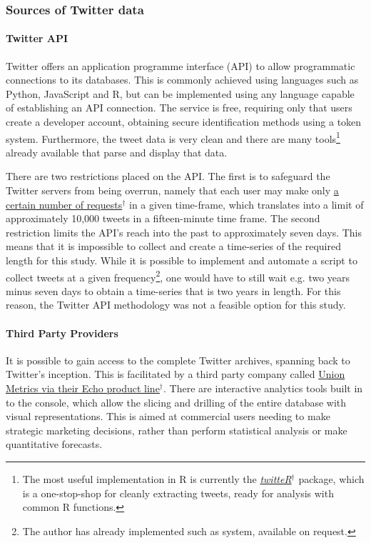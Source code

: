 \documentclass{article}
\begin{document}
\subsubsection{Sources of Twitter data \label{twitter-sources}}
\label{sec-1-2-3}


\paragraph{Twitter API}
\label{sec-1-2-3-1}
Twitter offers an application programme interface (API) to allow programmatic connections to its databases. This is commonly achieved using languages such as Python, JavaScript and R, but can be implemented using any language capable of establishing an API connection.
The service is free, requiring only that users create a developer account, obtaining secure identification methods using a token system. Furthermore, the tweet data is very clean and there are many tools\footnote{The most useful implementation in R is currently the \href{https://cran.r-project.org/web/packages/twitteR/index.html}{\emph{twitteR$^{\dag{}}$}} package, which is a one-stop-shop for cleanly extracting tweets, ready for analysis with common R functions.} already available that parse and display that data.

There are two restrictions placed on the API. The first is to safeguard the Twitter servers from being overrun, namely that each user may make only \href{https://dev.twitter.com/rest/public/rate-limits}{a certain number of requests$^{\dag{}}$} in a given time-frame, which translates into a limit of approximately 10,000 tweets in a fifteen-minute time frame. The second restriction limits the API's reach into the past to approximately seven days. This means that it is impossible to collect and create a time-series of the required length for this study. While it is possible to implement and automate a script to collect tweets at a given frequency\footnote{The author has already implemented such as system, available on request.}, one would have to still wait e.g. two years minus seven days to obtain a time-series that is two years in length. For this reason, the Twitter API methodology was not a feasible option for this study.



\paragraph{Third Party Providers}
\label{sec-1-2-3-2}
It is possible to gain access to the complete Twitter archives, spanning back to Twitter's inception. This is facilitated by a third party company called \href{https://unionmetrics.com/product/echo-twitter-archive-search/}{Union Metrics via their Echo product line$^{\dag{}}$}. There are interactive analytics tools built in to the console, which allow the slicing and drilling of the entire database with visual representations. This is aimed at commercial users needing to make strategic marketing decisions, rather than perform statistical analysis or make quantitative forecasts.
\end{document}

